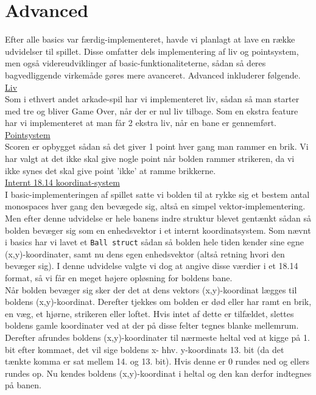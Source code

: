 \section{Advanced}
Efter alle basics var færdig-implementeret, havde vi planlagt at lave en række udvidelser til spillet. Disse omfatter dels implementering af liv og pointsystem, men også videreudviklinger af basic-funktionaliteterne, sådan så deres bagvedliggende virkemåde gøres mere avanceret. Advanced inkluderer følgende.\\

\underline{Liv}\\

Som i ethvert andet arkade-spil har vi implementeret liv, sådan så man starter med tre og bliver Game Over, når der er nul liv tilbage. Som en ekstra feature har vi implementeret at man får 2 ekstra liv, når en bane er gennemført.\\

\underline{Pointsystem}\\

Scoren er opbygget sådan så det giver 1 point hver gang man rammer en brik. Vi har valgt at det ikke skal give nogle point når bolden rammer strikeren, da vi ikke synes det skal give point 'ikke' at ramme brikkerne.\\

\underline{Internt 18.14 koordinat-system}\\

I basic-implementeringen af spillet satte vi bolden til at rykke sig et bestem antal monospaces hver gang den bevægede sig, altså en simpel vektor-implementering. Men efter denne udvidelse er hele banens indre struktur blevet gentænkt sådan så bolden bevæger sig som en enhedsvektor i et internt koordinatsystem. Som nævnt i basics har vi lavet et \texttt{Ball struct} sådan så bolden hele tiden kender sine egne (x,y)-koordinater, samt nu dens egen enhedsvektor (altså retning hvori den bevæger sig). I denne udvidelse valgte vi dog at angive disse værdier i et 18.14 format, så vi får en meget højere opløsning for boldens bane. \\
Når bolden bevæger sig sker der det at dens vektors (x,y)-koordinat lægges til boldens (x,y)-koordinat. Derefter tjekkes om bolden er død eller har ramt en brik, en væg, et hjørne, strikeren eller loftet. Hvis intet af dette er tilfældet, slettes boldens gamle koordinater ved at der på disse felter tegnes blanke mellemrum. Derefter afrundes boldens (x,y)-koordinater til nærmeste heltal ved at kigge på 1. bit efter kommaet, det vil sige boldens x- hhv. y-koordinats 13. bit (da det tænkte komma er sat mellem 14. og 13. bit). Hvis denne er 0 rundes ned og ellers rundes op. Nu kendes boldens (x,y)-koordinat i heltal og den kan derfor indtegnes på banen.\\

